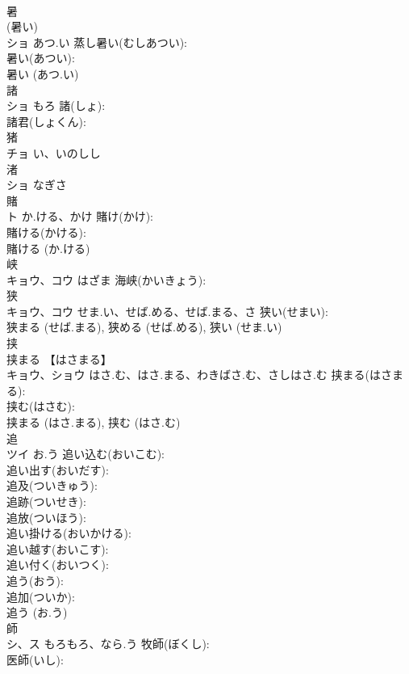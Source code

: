 \documentclass[8pt]{extreport}
\begin{document}
\begin{CJK}{UTF8}{min}
\\	暑			
\\	(暑い) 
\\	ショ	あつ.い	蒸し暑い(むしあつい): 
\\	暑い(あつい): 
\\	暑い (あつ.い)
\\	諸			
\\	ショ	もろ	諸(しょ): 
\\	諸君(しょくん): 
\\	猪			
\\	チョ	い、いのしし		
\\	渚			
\\	ショ	なぎさ		
\\	賭			
\\	ト	か.ける、かけ	賭け(かけ): 
\\	賭ける(かける): 
\\	賭ける (か.ける)
\\	峡			
\\	キョウ、コウ	はざま	海峡(かいきょう): 
\\	狭			
\\	キョウ、コウ	せま.い、せば.める、せば.まる、さ	狭い(せまい): 
\\	狭まる (せば.まる), 狭める (せば.める), 狭い (せま.い)
\\	挟			
\\	挟まる 【はさまる】 
\\	キョウ、ショウ	はさ.む、はさ.まる、わきばさ.む、さしはさ.む	挟まる(はさまる): 
\\	挟む(はさむ): 
\\	挟まる (はさ.まる), 挟む (はさ.む)
\\	追			
\\	ツイ	お.う	追い込む(おいこむ): 
\\	追い出す(おいだす): 
\\	追及(ついきゅう): 
\\	追跡(ついせき): 
\\	追放(ついほう): 
\\	追い掛ける(おいかける): 
\\	追い越す(おいこす): 
\\	追い付く(おいつく): 
\\	追う(おう): 
\\	追加(ついか): 
\\	追う (お.う)
\\	師			
\\	シ、ス	もろもろ、なら.う	牧師(ぼくし): 
\\	医師(いし): 

\end{CJK}
\end{document}
